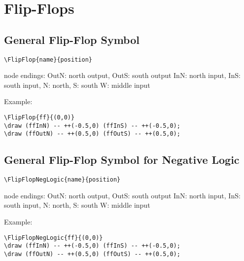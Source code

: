 \documentclass[parskip=full]{scrartcl}
\begin{document}
\section{Flip-Flops}

\subsection{General Flip-Flop Symbol}

\begin{verbatim}
\FlipFlop{name}{position}
\end{verbatim}
node endings: OutN: north output, OutS: south output
              InN: north input, InS: south input,
              N: north, S: south
              W: middle input

Example:\\
\begin{minipage}{0.8\textwidth}
\begin{verbatim}
\FlipFlop{ff}{(0,0)}
\draw (ffInN) -- ++(-0.5,0) (ffInS) -- ++(-0.5,0);
\draw (ffOutN) -- ++(0.5,0) (ffOutS) -- ++(0.5,0);
\end{verbatim}
\end{minipage}
\begin{minipage}{0.19\textwidth}
\end{minipage}

\subsection{General Flip-Flop Symbol for Negative Logic}

\begin{verbatim}
\FlipFlopNegLogic{name}{position}
\end{verbatim}
node endings: OutN: north output, OutS: south output
              InN: north input, InS: south input,
              N: north, S: south
              W: middle input

Example:\\
\begin{minipage}{0.8\textwidth}
\begin{verbatim}
\FlipFlopNegLogic{ff}{(0,0)}
\draw (ffInN) -- ++(-0.5,0) (ffInS) -- ++(-0.5,0);
\draw (ffOutN) -- ++(0.5,0) (ffOutS) -- ++(0.5,0);
\end{verbatim}
\end{minipage}
\begin{minipage}{0.19\textwidth}
\end{minipage}
\end{document}
